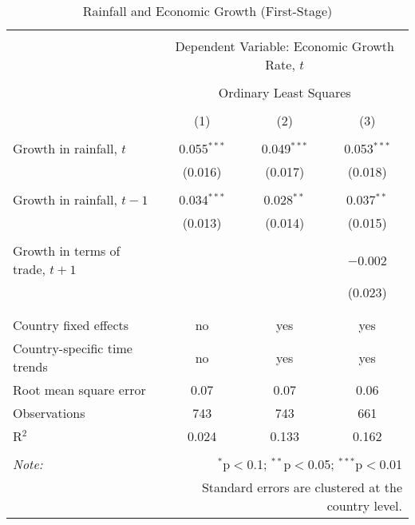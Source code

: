 
\begin{table}[!htbp] \centering 
  \caption{Rainfall and Economic Growth (First-Stage)} 
  \label{} 
\begin{tabular}{@{\extracolsep{5pt}}lccc} 
\\[-1.8ex]\hline 
\hline \\[-1.8ex] 
 & \multicolumn{3}{c}{Dependent Variable: Economic Growth Rate, $t$} \\ 
\cline{2-4} 
\\[-1.8ex] & \multicolumn{3}{c}{Ordinary Least Squares} \\ 
\\[-1.8ex] & (1) & (2) & (3)\\ 
\hline \\[-1.8ex] 
 Growth in rainfall, $t$ & 0.055$^{***}$ & 0.049$^{***}$ & 0.053$^{***}$ \\ 
  & (0.016) & (0.017) & (0.018) \\ 
  & & & \\ 
 Growth in rainfall, $t-1$ & 0.034$^{***}$ & 0.028$^{**}$ & 0.037$^{**}$ \\ 
  & (0.013) & (0.014) & (0.015) \\ 
  & & & \\ 
 Growth in terms of trade, $t+1$ &  &  & $-$0.002 \\ 
  &  &  & (0.023) \\ 
  & & & \\ 
\hline \\[-1.8ex] 
Country fixed effects & no & yes & yes \\ 
Country-specific time trends & no & yes & yes \\ 
Root mean square error & 0.07 & 0.07 & 0.06 \\ 
Observations & 743 & 743 & 661 \\ 
R$^{2}$ & 0.024 & 0.133 & 0.162 \\ 
\hline 
\hline \\[-1.8ex] 
\textit{Note:}  & \multicolumn{3}{r}{$^{*}$p$<$0.1; $^{**}$p$<$0.05; $^{***}$p$<$0.01} \\ 
 & \multicolumn{3}{r}{Standard errors are clustered at the country level.} \\ 
\end{tabular} 
\end{table} 
